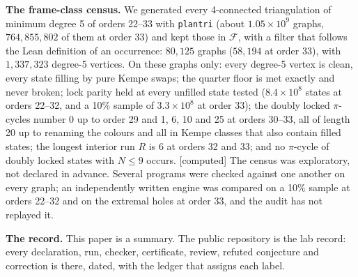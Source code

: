 \documentclass[11pt]{article}
\newcommand{\lab}[1]{\textsf{[#1]}}
\begin{document}
\textbf{The frame-class census.} We generated every 4-connected triangulation of minimum degree 5 of orders 22--33 with \texttt{plantri} (about $1.05\times10^9$ graphs, $764{,}855{,}802$ of them at order 33) and kept those in $\mathcal F$, with a filter that follows the Lean definition of an occurrence: $80{,}125$ graphs ($58{,}194$ at order 33), with $1{,}337{,}323$ degree-5 vertices. On these graphs only: every degree-5 vertex is clean, every state filling by pure Kempe swaps; the quarter floor is met exactly and never broken; lock parity held at every unfilled state tested ($8.4\times10^8$ states at orders 22--32, and a 10\% sample of $3.3\times10^8$ at order 33); the doubly locked $\pi$-cycles number 0 up to order 29 and 1, 6, 10 and 25 at orders 30--33, all of length 20 up to renaming the colours and all in Kempe classes that also contain filled states; the longest interior run $R$ is 6 at orders 32 and 33; and no $\pi$-cycle of doubly locked states with $N\le9$ occurs. \lab{computed} The census was exploratory, not declared in advance. Several programs were checked against one another on every graph; an independently written engine was compared on a 10\% sample at orders 22--32 and on the extremal holes at order 33, and the audit has not replayed it.

\textbf{The record.} This paper is a summary. The public repository is the lab record: every declaration, run, checker, certificate, review, refuted conjecture and correction is there, dated, with the ledger that assigns each label.
\end{document}
